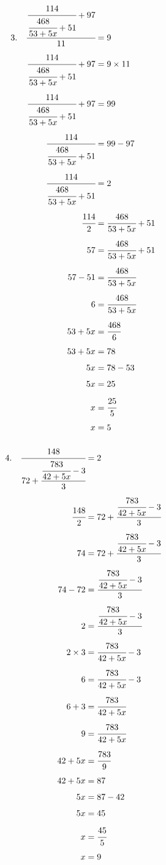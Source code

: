 \documentclass{article}
\begin{document}
\noindent
\begin{minipage}[t]{0.5000\textwidth}
\begin{align*}
3.\hspace{10pt}\cfrac{\cfrac{114}{\cfrac{468}{53+5x}+51}+97}{11}&=9\\[4pt]
\cfrac{114}{\cfrac{468}{53+5x}+51}+97&=9\times11\\[4pt]
\cfrac{114}{\cfrac{468}{53+5x}+51}+97&=99\\[4pt]
\cfrac{114}{\cfrac{468}{53+5x}+51}&=99-97\\[4pt]
\cfrac{114}{\cfrac{468}{53+5x}+51}&=2\\[4pt]
\cfrac{114}{2}&=\cfrac{468}{53+5x}+51\\[4pt]
57&=\cfrac{468}{53+5x}+51\\[4pt]
57-51&=\cfrac{468}{53+5x}\\[4pt]
6&=\cfrac{468}{53+5x}\\[4pt]
53+5x&=\cfrac{468}{6}\\[4pt]
53+5x&=78\\[4pt]
5x&=78-53\\[4pt]
5x&=25\\[4pt]
x&=\cfrac{25}{5}\\[4pt]
x&=5\\[4pt]
\end{align*}
\end{minipage}
\begin{minipage}[t]{0.5000\textwidth}
\begin{align*}
4.\hspace{10pt}\cfrac{148}{72+\cfrac{\cfrac{783}{42+5x}-3}{3}}&=2\\[4pt]
\cfrac{148}{2}&=72+\cfrac{\cfrac{783}{42+5x}-3}{3}\\[4pt]
74&=72+\cfrac{\cfrac{783}{42+5x}-3}{3}\\[4pt]
74-72&=\cfrac{\cfrac{783}{42+5x}-3}{3}\\[4pt]
2&=\cfrac{\cfrac{783}{42+5x}-3}{3}\\[4pt]
2\times3&=\cfrac{783}{42+5x}-3\\[4pt]
6&=\cfrac{783}{42+5x}-3\\[4pt]
6+3&=\cfrac{783}{42+5x}\\[4pt]
9&=\cfrac{783}{42+5x}\\[4pt]
42+5x&=\cfrac{783}{9}\\[4pt]
42+5x&=87\\[4pt]
5x&=87-42\\[4pt]
5x&=45\\[4pt]
x&=\cfrac{45}{5}\\[4pt]
x&=9\\[4pt]
\end{align*}
\end{minipage}
\vspace{10 mm}
\end{document}
